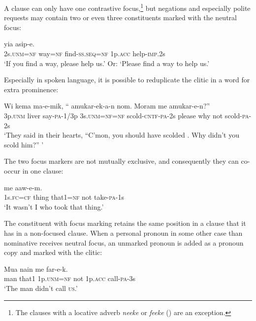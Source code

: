 A clause can only have one contrastive focus,\footnote{The clauses with a locative adverb \textit{neeke} or \textit{feeke} () are an exception.}  but negations and especially polite requests may contain two or even three constituents marked with the neutral focus:

\ea%
\label{ex:9:x1729}
\gll {}    yia  asip-e.\\
2s.\textsc{unm}=\textsc{nf}  way=\textsc{nf}  find-\textsc{ss}.\textsc{seq}=\textsc{nf}  1p.\textsc{acc}  help-\textsc{imp}.2s\\
\glt`If you find a way, please help us.' Or: `Please find a way to help us.'
\z


Especially in spoken language, it is possible to reduplicate the  clitic in a word for extra prominence:

\ea%
\label{ex:9:x1731}
\gll Wi  kema  ma-e-mik,  ``  amukar-ek-a-n nom.  Moram  me  amukar-e-n?''  \\
3p.\textsc{unm}  liver  say-\textsc{pa}-1/3p  3s.\textsc{unm}=\textsc{nf}=\textsc{nf}  scold-\textsc{cntf}-\textsc{pa}-2s please  why  not  scold-\textsc{pa}-2s\\
\glt`They said in their hearts, ``C'mon, you should have scolded . Why didn't you scold him?'' '
\z


The two focus markers are not mutually exclusive, and consequently they can co-occur in one clause:

\ea%
\label{ex:9:x1737}
\gll {}    me  aaw-e-m.\\
1s.\textsc{fc}=\textsc{cf}  thing  that1=\textsc{nf}  not  take-\textsc{pa}-1s\\
\glt`It wasn't I who took that thing.'
\z


The constituent with focus marking retains the same position in a clause that it has in a non-focused clause. When a personal pronoun in some other case than nominative receives neutral focus, an unmarked pronoun is added as a pronoun copy and marked with the  clitic:

\ea%
\label{ex:9:x1743}
\gll Mua  nain    me    far-e-k. \\
man  that1  1p.\textsc{unm}=\textsc{nf}  not  1p.\textsc{acc}  call-\textsc{pa}-3s      \\
\glt`The man didn't call \textsc{us}.'
\z


